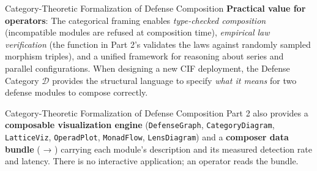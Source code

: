 \documentclass[
  ignorenonframetext,
]{beamer}
\providecommand{\calD}{\mathcal{D}}
\begin{document}
\begin{frame}{Category-Theoretic Formalization
of Defense Composition}
\textbf{Practical value for operators}: The categorical framing enables
\emph{type-checked composition} (incompatible modules are refused at
composition time), \emph{empirical law verification} (the
 function in Part 2's
 validates the laws against
randomly sampled morphism triples), and a unified framework for
reasoning about series and parallel configurations. When designing a new
CIF deployment, the Defense Category \(\calD\) provides the structural
language to specify \emph{what it means} for two defense modules to
compose correctly.

\end{frame}

\begin{frame}{Category-Theoretic Formalization
of Defense Composition}
Part 2 also provides a \textbf{composable visualization engine}
(\texttt{DefenseGraph}, \texttt{CategoryDiagram}, \texttt{LatticeViz},
\texttt{OperadPlot}, \texttt{MonadFlow}, \texttt{LensDiagram}) and a
\textbf{composer data bundle}
( →
) carrying each module's
description and its measured detection rate and latency. There is no
interactive application; an operator reads the bundle.
\end{frame}
\end{document}

